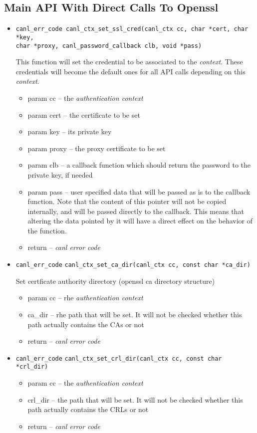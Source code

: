 \subsection{Main API With Direct Calls To Openssl}

\begin{itemize}
  \item \begin{verbatim}canl_err_code canl_ctx_set_ssl_cred(canl_ctx cc, char *cert, char *key,
char *proxy, canl_password_callback clb, void *pass)\end{verbatim}
  This function will set the credential to be associated to the
  \textit{context}.  These credentials will become the default ones 
  for all API calls depending on this \textit{context}.
  \begin{itemize}
    \item param cc -- the \textit{authentication context}
    \item param cert -- the certificate to be set
    \item param key -- its private key
    \item param proxy -- the proxy certificate to be set
    \item param clb -- a callback function which should return 
    the password to the private key, if needed
    \item param pass -- user specified data that will be passed 
    as is to the callback function.  Note that the content of this 
    pointer will not be copied internally, and will be passed
    directly to the callback.  This means that altering the 
    data pointed by it will have
    a direct effect on the behavior of the function.
    \item return -- \textit{canl error code}
  \end{itemize}
  \item \verb'canl_err_code'
  \verb'canl_ctx_set_ca_dir(canl_ctx cc, const char *ca_dir)'

  Set certficate authority directory (openssl ca directory structure)
    \begin{itemize} 
    \item param cc -- rhe \textit{authentication context}
    \item ca\_dir -- rhe path that will be set.  It will not be 
    checked whether this path actually contains the CAs or not
    \item return -- \textit{canl error code}
    \end{itemize}
  \item \verb'canl_err_code'
  \verb'canl_ctx_set_crl_dir(canl_ctx cc, const char *crl_dir)'
    \begin{itemize} 
    \item param cc -- the \textit{authentication context}
    \item crl\_dir -- the path that will be set.  It will not be 
    checked whether this path actually contains the CRLs or not
    \item return -- \textit{canl error code}
    \end{itemize}

\end{itemize}
